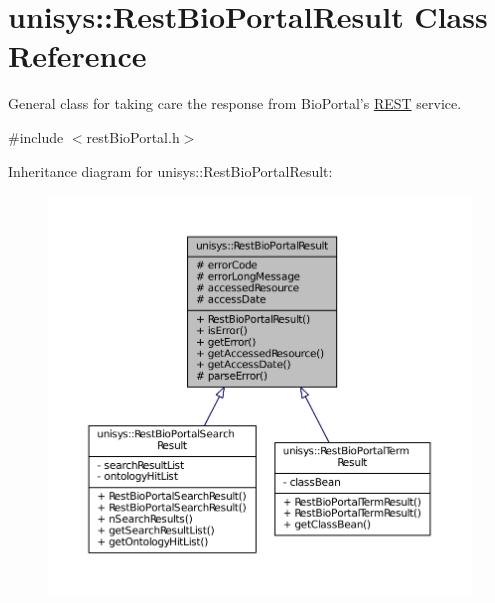 \hypertarget{classunisys_1_1RestBioPortalResult}{\section{unisys\-:\-:Rest\-Bio\-Portal\-Result Class Reference}
\label{classunisys_1_1RestBioPortalResult}
}


General class for taking care the response from Bio\-Portal's \hyperlink{classunisys_1_1REST}{R\-E\-S\-T} service.  




{\ttfamily \#include $<$rest\-Bio\-Portal.\-h$>$}



Inheritance diagram for unisys\-:\-:Rest\-Bio\-Portal\-Result\-:
\nopagebreak
\begin{figure}[H]
\begin{center}
\leavevmode
\includegraphics[width=350pt]{classunisys_1_1RestBioPortalResult__inherit__graph}
\end{center}
\end{figure}


